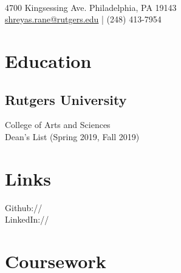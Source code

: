 \documentclass[]{deedy-resume-openfont}
\begin{document}
%
%
\lastupdated

%
%


{ 
\\
{4700 Kingsessing Ave. Philadelphia, PA 19143}\\
\href{mailto:shreyas.rane@rutgers.edu}{shreyas.rane@rutgers.edu} | (248) 413-7954
}

%
%

\begin{minipage}[t]{0.33\textwidth} 


\section{Education} 

\subsection{Rutgers University}
College of Arts and Sciences\\
Dean's List (Spring 2019, Fall 2019) \\
\sectionsep


\section{Links} 
Github:// \href{https://github.com/twopiaresquared}{} \\
LinkedIn://  \href{https://www.linkedin.com/in/shreyas-rane-760a9b155/}{} \\

\sectionsep


\section{Coursework}

\end{minipage}
\end{document}
